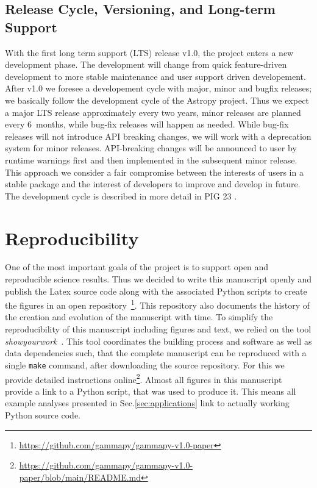 \documentclass[traditabstract, longauth]{aa}
\newcommand{\code}[1]{\texttt{#1}}
\begin{document}
\subsection{Release Cycle, Versioning, and Long-term Support}
\label{ssec:release-cycle}
With the first long term support (LTS) release v1.0, the \gammapy project
enters a new development phase. The development will change from
quick feature-driven development to more stable maintenance
and user support driven developement. After v1.0 we foresee
a developement cycle with major, minor and bugfix releases;
we basically follow the development cycle of the Astropy
project. Thus we expect a major LTS release approximately
every two years, minor releases are planned every 6~months,
while bug-fix releases will happen as needed. While
bug-fix releases will not introduce API breaking changes,
we will work with a deprecation system for minor releases.
API-breaking changes will be announced to user by runtime
warnings first and then implemented in the subsequent
minor release. This approach we consider a fair
compromise between the interests of users in a stable
package and the interest of developers to improve
and develop \gammapy in future. The development cycle is described
in more detail in PIG 23 \citep{gammapy_pig_23}.

\section{Reproducibility}
\label{sec:reproducibility}
One of the most important goals of the \gammapy project is to support open and
reproducible science results. Thus we decided to write this manuscript
openly and publish the Latex source code along with the associated
Python scripts to create the figures
in an open repository~\footnote{\url{https://github.com/gammapy/gammapy-v1.0-paper}}.
This \github repository also documents the history of the creation
and evolution of the manuscript with time. To simplify the reproducibility
of this manuscript including figures and text, we relied on the tool
\textit{showyourwork}~\citep{Luger2021}. This tool coordinates the building
process and software as well as data dependencies such, that the complete
manuscript can be reproduced with a single \code{make} command, after
downloading the source repository. For this we provide
detailed instructions online\footnote{\url{https://github.com/gammapy/gammapy-v1.0-paper/blob/main/README.md}}.
Almost all figures in this manuscript provide a link
to a Python script, that was used to produce it. This means all
example analyses presented in Sec.\ref{sec:applications} link to
actually working Python source code.
\end{document}
